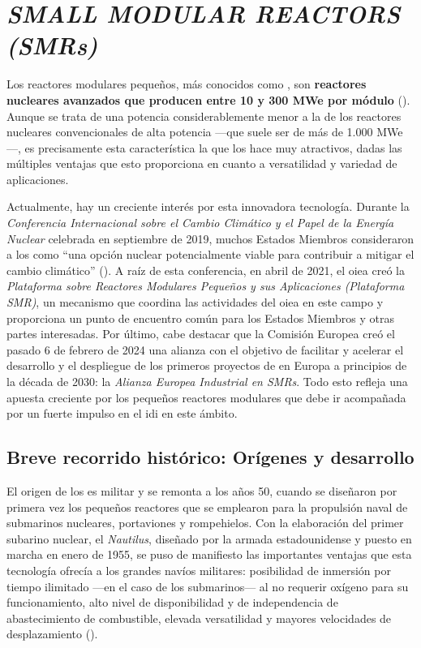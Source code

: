 \newpage
\section{\emph{SMALL MODULAR REACTORS (SMRs)}} \label{small_modular_reactors}

Los reactores modulares pequeños, más conocidos como , son \textbf{reactores nucleares avanzados que producen entre 10 y 300 MWe por módulo} (\cite{nea_smrs_2021}). Aunque se trata de una potencia considerablemente menor a la de los reactores nucleares convencionales de alta potencia ---que suele ser de más de 1.000 MWe---, es precisamente esta característica la que los hace muy atractivos, dadas las múltiples ventajas que esto proporciona en cuanto a versatilidad y variedad de aplicaciones.

Actualmente, hay un creciente interés por esta innovadora tecnología. Durante la \emph{Conferencia Internacional sobre el Cambio Climático y el Papel de la Energía Nuclear} celebrada en septiembre de 2019, muchos Estados Miembros consideraron a los  como ``una opción nuclear potencialmente viable para contribuir a mitigar el cambio climático'' (\cite{oiea_informe_2019}). A raíz de esta conferencia, en abril de 2021, el \acrfull{oiea} creó la \emph{Plataforma sobre Reactores Modulares Pequeños y sus Aplicaciones (Plataforma SMR)}, un mecanismo que coordina las actividades del \acrshort{oiea} en este campo y proporciona un punto de encuentro común para los Estados Miembros y otras partes interesadas. Por último, cabe destacar que la Comisión Europea creó el pasado 6 de febrero de 2024 una alianza con el objetivo de facilitar y acelerar el desarrollo y el despliegue de los primeros proyectos de  en Europa a principios de la década de 2030: la \emph{Alianza Europea Industrial en SMRs}. Todo esto refleja una apuesta creciente por los pequeños reactores modulares que debe ir acompañada por un fuerte impulso en el \acrshort{idi} en este ámbito.

\subsection{Breve recorrido histórico: Orígenes y desarrollo}

El origen de los  es militar y se remonta a los años 50, cuando se diseñaron por primera vez los pequeños reactores que se emplearon para la propulsión naval de submarinos nucleares, portaviones y rompehielos. Con la elaboración del primer subarino nuclear, el \emph{Nautilus}, diseñado por la armada estadounidense y puesto en marcha en enero de 1955, se puso de manifiesto las importantes ventajas que esta tecnología ofrecía a los grandes navíos militares: posibilidad de inmersión por tiempo ilimitado ---en el caso de los submarinos--- al no requerir oxígeno para su funcionamiento, alto nivel de disponibilidad y de independencia de abastecimiento de combustible, elevada versatilidad y mayores velocidades de desplazamiento (\cite{propulsion_naval_nuclear}).

